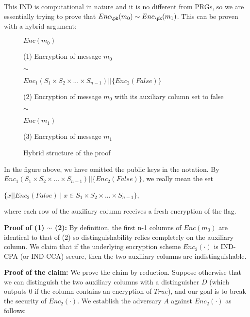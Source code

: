 \documentclass[10pt]{article}
\begin{document}
This IND is computational in nature and it is no different from PRGs, so we are essentially trying to prove that $Enc_\pk(m_0) \sim Enc_\pk(m_1)$. This can be proven with a hybrid argument:

\begin{figure}[H]
\begin{minipage}[center]{0.25\linewidth}
\begin{framed}
$Enc(m_0)$\\
\end{framed}
(1) Encryption of message $m_0$ \\
\end{minipage}
\hfill
{\Huge{$\sim$}}
\hfill
\begin{minipage}[center]{0.35\linewidth}
\begin{framed}
$Enc_1(S_1 \times S_2 \times ... \times S_{n-1}) || \{Enc_2(False)\}$
\end{framed}
(2) Encryption of message $m_0$ with its auxiliary column set to false
\end{minipage}
\hfill
{\Huge{$\sim$}}
\hfill
\begin{minipage}[center]{0.25\linewidth}
\begin{framed}
$Enc(m_1)$\\
\end{framed}
(3) Encryption of message $m_1$  \\
\end{minipage}

\caption{Hybrid structure of the proof}
\label{Hybrid1}
\end{figure}

In the figure above, we have omitted the public keys in the notation. By $Enc_1(S_1 \times S_2 \times ... \times S_{n-1}) || \{Enc_2(False)\}$, we really mean the set 
\begin{center}
$\{x || Enc_2(False) \mid x \in S_1 \times S_2 \times ... \times S_{n-1}\}$,
\end{center}
where each row of the auxiliary column receives a fresh encryption of the flag.

\textbf{Proof of (1) $\sim$ (2): } By definition, the first n-1 columns of $Enc(m_0)$ are identical to that of (2) so distinguishability relies completely on the auxiliary column. We claim that if the underlying encryption scheme $Enc_2(\cdot)$ is IND-CPA (or IND-CCA) secure, then the two auxiliary columns are indistinguishable.

\textbf{Proof of the claim: } We prove the claim by reduction. Suppose otherwise that we can distinguish the two auxiliary columns with a distinguisher $D$ (which outputs 0 if the column contains an encryption of $True$), and our goal is to break the security of $Enc_2(\cdot)$. We establish the adversary $A$ against $Enc_2(\cdot)$ as follows:
\end{document}
